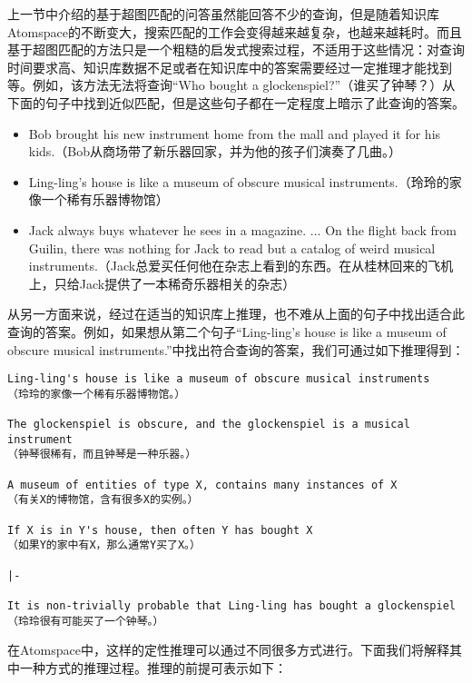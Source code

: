 上一节中介绍的基于超图匹配的问答虽然能回答不少的查询，但是随着知识库Atomspace的不断变大，搜索匹配的工作会变得越来越复杂，也越来越耗时。而且基于超图匹配的方法只是一个粗糙的启发式搜索过程，不适用于这些情况：对查询时间要求高、知识库数据不足或者在知识库中的答案需要经过一定推理才能找到等。例如，该方法无法将查询“Who bought a glockenspiel?”（谁买了钟琴？）从下面的句子中找到近似匹配，但是这些句子都在一定程度上暗示了此查询的答案。

\begin{itemize}
\item Bob brought his new instrument home from the mall and played it for his kids.（Bob从商场带了新乐器回家，并为他的孩子们演奏了几曲。）
\item Ling-ling's house is like a museum of obscure musical instruments.（玲玲的家像一个稀有乐器博物馆）
\item Jack always buys whatever he sees in a magazine. ... On the flight back from Guilin, there was nothing for Jack to read but a catalog of weird musical instruments.（Jack总爱买任何他在杂志上看到的东西。在从桂林回来的飞机上，只给Jack提供了一本稀奇乐器相关的杂志）
\end{itemize}

从另一方面来说，经过在适当的知识库上推理，也不难从上面的句子中找出适合此查询的答案。例如，如果想从第二个句子“Ling-ling's house is like a museum of obscure musical instruments.”中找出符合查询的答案，我们可通过如下推理得到：

\begin{verbatim}
Ling-ling's house is like a museum of obscure musical instruments
（玲玲的家像一个稀有乐器博物馆。）

The glockenspiel is obscure, and the glockenspiel is a musical instrument
（钟琴很稀有，而且钟琴是一种乐器。）

A museum of entities of type X, contains many instances of X
（有关X的博物馆，含有很多X的实例。）

If X is in Y's house, then often Y has bought X
（如果Y的家中有X，那么通常Y买了X。）

|-

It is non-trivially probable that Ling-ling has bought a glockenspiel
（玲玲很有可能买了一个钟琴。）
\end{verbatim}

在Atomspace中，这样的定性推理可以通过不同很多方式进行。下面我们将解释其中一种方式的推理过程。推理的前提可表示如下：

